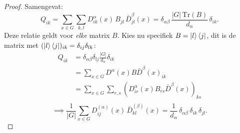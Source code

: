 \begin{proof}
    Samengevat:
    \[
    Q_{ik} = \sum_{x \in G} \sum_{k,l} D^\alpha_{ik}(x)\, B_{jl}\, \bar{D}^\beta_{jl}(x)
    = \delta_{\alpha\beta}\,\frac{|G|\,\text{Tr}(B)}{d_\alpha}\,\delta_{ik}.
    \]
    Deze relatie geldt voor \emph{elke} matrix \(B\). Kies nu specifiek \(B =  \ket{l}\bra{j}\),
    dit is de matrix met \((\ket{l}\bra{j})_{ik} = \delta_{ij} \delta_{lk}\):
    \begin{align*}
    Q_{ik} &= \delta_{\alpha\beta} \delta_{lj}\frac{|G|}{d_\alpha} \delta_{ik} \\
    &= \sum_{x \in G} D^\alpha(x)B \bar{D}^\beta(x)_{ik} \\
    &= \sum_{x \in G} \sum_{r,s} (D^\alpha_{ir}(x) B_{rs} \bar{D}^\beta(x))_{ks} \\
    \end{align*}
    \[
    \implies
    \frac{1}{|G|}\sum_{x \in G} D^{(\alpha)}_{ij}(x)\, \bar{D}^{(\beta)}_{kl}(x) = \frac{1}{d_\alpha}\,\delta_{\alpha\beta}\,\delta_{ik}\,\delta_{jl}.
    \]

\end{proof}